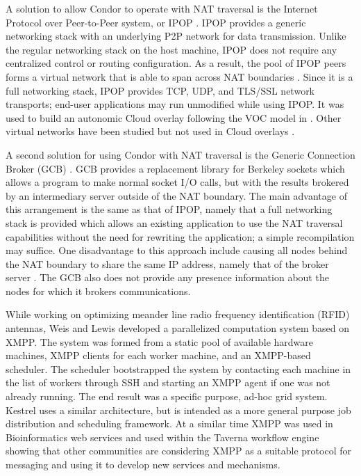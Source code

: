 A solution to allow Condor to operate with NAT traversal is the Internet
Protocol over Peer-to-Peer system, or IPOP \cite{Ganguly2006}. IPOP
provides a generic networking stack with an underlying P2P network
for data transmission. Unlike the regular networking stack on the
host machine, IPOP does not require any centralized control or routing
configuration. As a result, the pool of IPOP peers forms a virtual
network that is able to span across NAT boundaries \cite{Ganguly2006a}.
Since it is a full networking stack, IPOP provides TCP, UDP, and TLS/SSL
network transports; end-user applications may run unmodified while
using IPOP. It was used to build an autonomic Cloud overlay following
the VOC model in \cite{Abraham2010}. Other virtual networks have
been studied but not used in Cloud overlays \cite{Ruth2005,Tsugawa2006}.

A second solution for using Condor with NAT traversal is the Generic
Connection Broker (GCB) \cite{GCB}. GCB provides a replacement library
for Berkeley sockets which allows a program to make normal socket I/O
calls, but with the results brokered by an intermediary server outside
of the NAT boundary. The main advantage of this arrangement is the 
same as that of IPOP, namely that a full networking stack is provided which
allows an existing application to use the NAT traversal capabilities without
the need for rewriting the application; a simple recompilation may suffice.
One disadvantage to this approach include causing all nodes behind the
NAT boundary to share the same IP address, namely that of the broker server \cite{GCB2}.
The GCB also does not provide any presence information about the nodes for
which it brokers communications.

While working on optimizing meander line radio frequency identification
(RFID) antennas, Weis and Lewis \cite{Weis2009} developed a parallelized
computation system based on XMPP. The system was formed from a static
pool of available hardware machines, XMPP clients for each worker
machine, and an XMPP-based scheduler. The scheduler bootstrapped the
system by contacting each machine in the list of workers through SSH
and starting an XMPP agent if one was not already running. The end
result was a specific purpose, ad-hoc grid system. Kestrel uses a
similar architecture, but is intended as a more general purpose job
distribution and scheduling framework. At a similar time XMPP was
used in Bioinformatics web services \cite{Wagener2009} and used within
the Taverna workflow engine \cite{Oinn2004} showing that other communities
are considering XMPP as a suitable protocol for messaging and using
it to develop new services and mechanisms.
